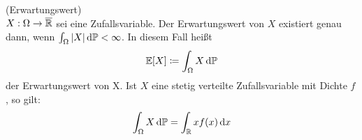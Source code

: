 \begin{Definition}(Erwartungswert)\\
	$ X:\Omega \to \overline{\mathbb{R}} $ sei eine Zufallsvariable.
	Der Erwartungswert von $ X $ existiert genau dann, wenn $ \int_{\Omega} |X| \, \mathrm{d} \mathbb{P} < \infty $. In diesem Fall heißt
	\begin{align*}
	\mathbb{E}[X] \coloneqq \int_{\Omega} X \, \mathrm{d} \mathbb{P} 
	\end{align*}
	der Erwartungswert von X. 
	Ist $ X $ eine stetig verteilte Zufallsvariable mit Dichte $ f $, so gilt:
	\[
		\int_{\Omega} X \, \mathrm{d} \mathbb{P} = \int_{\mathbb{R}} x f(x) \, \mathrm{d} x
	\]
\end{Definition}

